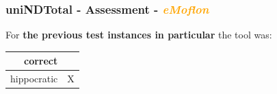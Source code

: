 \documentclass{beamer}
\newcommand{\cmark}{\ding{51}}%
\begin{document}
\begin{frame}
\frametitle{uniNDTotal - \textbf{Assessment} - \textbf{\textit{\textcolor{orange}{eMoflon}}}}

For \textbf{the previous test instances in particular} the tool was:

\begin{center}
\begin{tabular}{| r | c |}
  \hline                        
  correct & \cmark\\
  \hline
  hippocratic & X \\
  \hline 
\end{tabular}
\end{center}

\end{frame}
\end{document}
